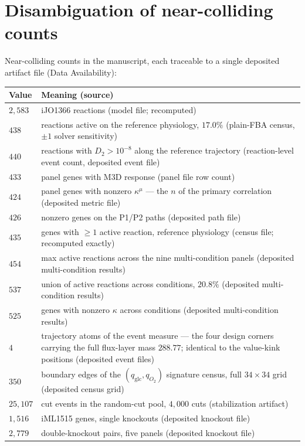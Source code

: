 \documentclass[11pt,a4paper]{article}
\theoremstyle{plain}
\theoremstyle{definition}
\theoremstyle{remark}
\newcommand{\kmu}{\kappa^{\mu}}
\begin{document}
\appendix
\section{Disambiguation of near-colliding counts}\label{sec:counts}

Near-colliding counts in the manuscript, each traceable to a single deposited artifact file (Data Availability):

\noindent\begin{minipage}{\textwidth}\footnotesize
\begin{tabularx}{\textwidth}{@{}l>{\raggedright\arraybackslash}X@{}}
\toprule
\textbf{Value} & \textbf{Meaning (source)} \\
\midrule
$2{,}583$ & iJO1366 reactions (model file; recomputed) \\
$438$ & reactions active on the reference physiology, $17.0\%$ (plain-FBA census, $\pm 1$ solver sensitivity) \\
$440$ & reactions with $D_2 > 10^{-8}$ along the reference trajectory (reaction-level event count, deposited event file) \\
$433$ & panel genes with M3D response (panel file row count) \\
$424$ & panel genes with nonzero $\kmu$ --- the $n$ of the primary correlation (deposited metric file) \\
$426$ & nonzero genes on the P1/P2 paths (deposited path file) \\
$435$ & genes with $\ge 1$ active reaction, reference physiology (census file; recomputed exactly) \\
$454$ & max active reactions across the nine multi-condition panels (deposited multi-condition results) \\
$537$ & union of active reactions across conditions, $20.8\%$ (deposited multi-condition results) \\
$525$ & genes with nonzero $\kappa$ across conditions (deposited multi-condition results) \\
$4$ & trajectory atoms of the event measure --- the four design corners carrying the full flux-layer mass $288.77$; identical to the value-kink positions (deposited event files) \\
$350$ & boundary edges of the $(q_{\mathrm{glc}}, q_{O_2})$ signature census, full $34\times34$ grid (deposited census grid) \\
$25{,}107$ & cut events in the random-cut pool, $4{,}000$ cuts (stabilization artifact) \\
$1{,}516$ & iML1515 genes, single knockouts (deposited knockout file) \\
$2{,}779$ & double-knockout pairs, five panels (deposited knockout file) \\
\bottomrule
\end{tabularx}
\end{minipage}
\end{document}
